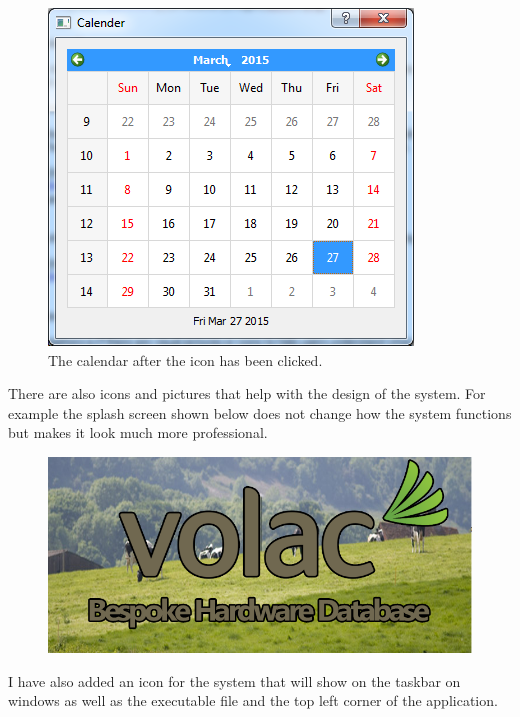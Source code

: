 \begin{figure}[H]
    \includegraphics[width=\textwidth]{./Evaluation/Images/calandericon2.png}
    \caption{The calendar after the icon has been clicked.} 
\end{figure}

There are also icons and pictures that help with the design of the system. For example the splash screen shown below does not change how the system functions but makes it look much more professional.

\begin{figure}[H]
    \includegraphics[width=\textwidth]{./Evaluation/Images/splashscreen.png}
\end{figure}

I have also added an icon for the system that will show on the taskbar on windows as well as the executable file and the top left corner of the application.

